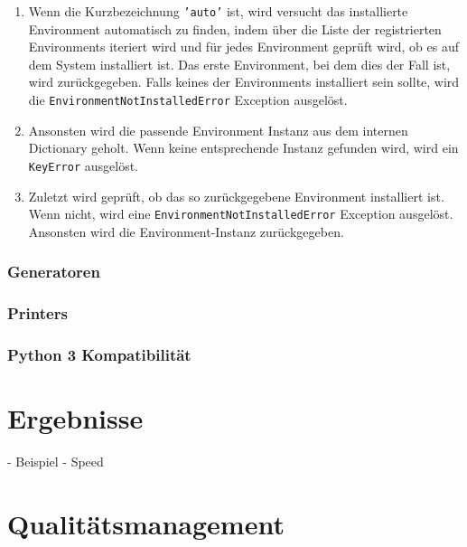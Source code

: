 \begin{enumerate}
	\item Wenn die Kurzbezeichnung \texttt{'auto'} ist, wird versucht das
		installierte Environment automatisch zu finden, indem über die Liste der
		registrierten Environments iteriert wird und für jedes Environment geprüft
		wird, ob es auf dem System installiert ist. Das erste Environment, bei dem
		dies der Fall ist, wird zurückgegeben. Falls keines der Environments
		installiert sein sollte, wird die \texttt{EnvironmentNotInstalledError}
		Exception ausgelöst.
	\item Ansonsten wird die passende Environment Instanz aus dem internen
		Dictionary geholt. Wenn keine entsprechende Instanz gefunden wird, wird ein
		\texttt{KeyError} ausgelöst.
	\item Zuletzt wird geprüft, ob das so zurückgegebene Environment installiert
		ist. Wenn nicht, wird eine \texttt{EnvironmentNotInstalledError} Exception
		ausgelöst. Ansonsten wird die Environment-Instanz zurückgegeben.
\end{enumerate}

\subsubsection{Generatoren}
\label{swidgenerator:architektur:generatoren}

\subsubsection{Printers}
\label{swidgenerator:architektur:printers}


\subsubsection{Python 3 Kompatibilität}




\section{Ergebnisse}

- Beispiel
- Speed



\section{Qualitätsmanagement}
\label{swidgenerator:architektur:qa}

